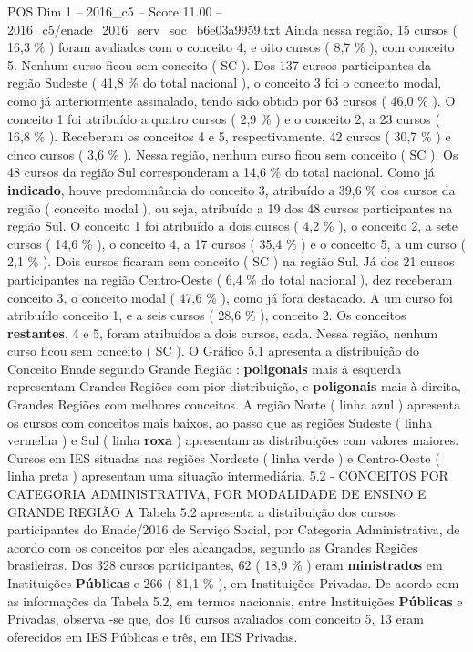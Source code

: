 \begin{textsample}{POS Dim 1 – 2016\_c5 – Score 11.00 – 2016\_c5/enade\_2016\_serv\_soc\_b6e03a9959.txt}
Ainda nessa região, 15 cursos ( 16,3 \% ) foram avaliados com o conceito 4, e oito cursos ( 8,7 \% ), com conceito 5.
Nenhum curso ficou sem conceito ( SC ).
Dos 137 cursos participantes da região Sudeste ( 41,8 \% do total nacional ), o conceito 3 foi o conceito modal, como já anteriormente assinalado, tendo sido obtido por 63 cursos ( 46,0 \% ).
O conceito 1 foi atribuído a quatro cursos ( 2,9 \% ) e o conceito 2, a 23 cursos ( 16,8 \% ).
Receberam os conceitos 4 e 5, respectivamente, 42 cursos ( 30,7 \% ) e cinco cursos ( 3,6 \% ).
Nessa região, nenhum curso ficou sem conceito ( SC ).
Os 48 cursos da região Sul corresponderam a 14,6 \% do total nacional.
Como já \textbf{indicado}, houve predominância do conceito 3, atribuído a 39,6 \% dos cursos da região ( conceito modal ), ou seja, atribuído a 19 dos 48 cursos participantes na região Sul.
O conceito 1 foi atribuído a dois cursos ( 4,2 \% ), o conceito 2, a sete cursos ( 14,6 \% ), o conceito 4, a 17 cursos ( 35,4 \% ) e o conceito 5, a um curso ( 2,1 \% ).
Dois cursos ficaram sem conceito ( SC ) na região Sul.
Já dos 21 cursos participantes na região Centro-Oeste ( 6,4 \% do total nacional ), dez receberam conceito 3, o conceito modal ( 47,6 \% ), como já fora destacado.
A um curso foi atribuído conceito 1, e a seis cursos ( 28,6 \% ), conceito 2.
Os conceitos \textbf{restantes}, 4 e 5, foram atribuídos a dois cursos, cada.
Nessa região, nenhum curso ficou sem conceito ( SC ).
O Gráfico 5.1 apresenta a distribuição do Conceito Enade segundo Grande Região : \textbf{poligonais} mais à esquerda representam Grandes Regiões com pior distribuição, e \textbf{poligonais} mais à direita, Grandes Regiões com melhores conceitos.
A região Norte ( linha azul ) apresenta os cursos com conceitos mais baixos, ao passo que as regiões Sudeste ( linha vermelha ) e Sul ( linha \textbf{roxa} ) apresentam as distribuições com valores maiores.
Cursos em IES situadas nas regiões Nordeste ( linha verde ) e Centro-Oeste ( linha preta ) apresentam uma situação intermediária. 5.2 - CONCEITOS POR CATEGORIA ADMINISTRATIVA, POR MODALIDADE DE ENSINO E GRANDE REGIÃO A Tabela 5.2 apresenta a distribuição dos cursos participantes do Enade/2016 de Serviço Social, por Categoria Administrativa, de acordo com os conceitos por eles alcançados, segundo as Grandes Regiões brasileiras.
Dos 328 cursos participantes, 62 ( 18,9 \% ) eram \textbf{ministrados} em Instituições \textbf{Públicas} e 266 ( 81,1 \% ), em Instituições Privadas.
De acordo com as informações da Tabela 5.2, em termos nacionais, entre Instituições \textbf{Públicas} e Privadas, observa -se que, dos 16 cursos avaliados com conceito 5, 13 eram oferecidos em IES Públicas e três, em IES Privadas.

\end{textsample}
